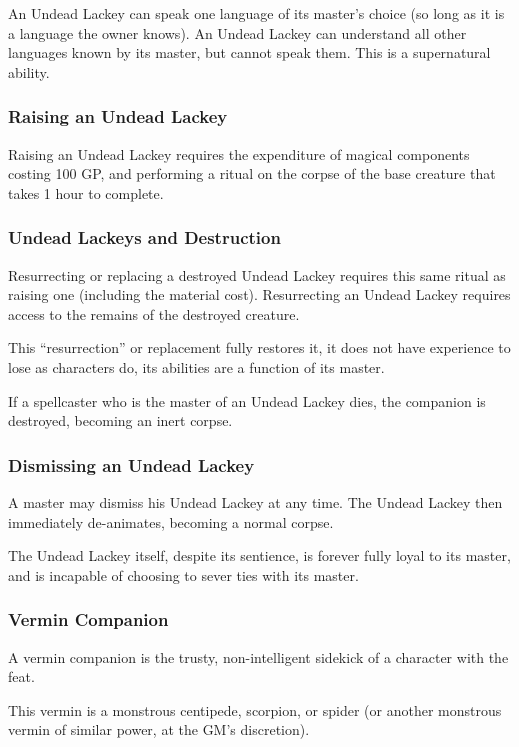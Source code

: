 An Undead Lackey can speak one language of its master's choice (so long as it is a language the owner knows). 
An Undead Lackey can understand all other languages known by its master, but cannot speak them. This is a supernatural ability. 
\subsubsection{Raising an Undead Lackey}
Raising an Undead Lackey requires the expenditure of magical components costing 100 GP, and performing a ritual on the corpse of the base creature that takes 1 hour to complete.
\subsubsection{Undead Lackeys and Destruction}
Resurrecting or replacing a destroyed Undead Lackey requires this same ritual as raising one (including the material cost). Resurrecting an Undead Lackey requires access to the remains of the destroyed creature.

This ``resurrection'' or replacement fully restores it, it does not have experience to lose as characters do, its abilities are a function of its master.

If a spellcaster who is the master of an Undead Lackey dies, the companion is destroyed, becoming an inert corpse.
\subsubsection{Dismissing an Undead Lackey}
A master may dismiss his Undead Lackey at any time. The Undead Lackey then immediately de-animates, becoming a normal corpse.

The Undead Lackey itself, despite its sentience, is forever fully loyal to its master, and is incapable of choosing to sever ties with its master.
\subsubsection{Vermin Companion}
\label{sec:VerminCompanion}
A vermin companion is the trusty, non-intelligent sidekick of a character with the  feat.

This vermin is a monstrous centipede, scorpion, or spider (or another monstrous vermin of similar power, at the GM's discretion).

